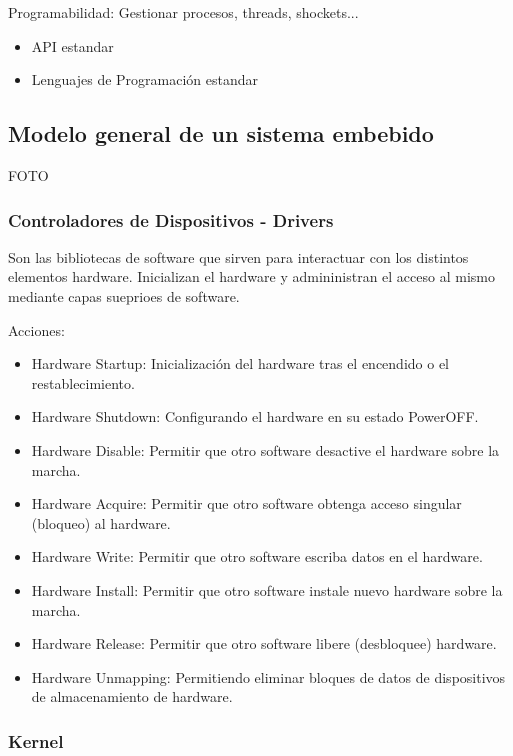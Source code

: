 \documentclass[12pt]{report} %
\begin{document}
Programabilidad: Gestionar procesos, threads, shockets...
\begin{itemize}
	\item API estandar 
	\item Lenguajes de Programación estandar 
\end{itemize}

\subsection{Modelo general de un sistema embebido}
FOTO

\subsubsection{Controladores de Dispositivos - Drivers}
Son las bibliotecas de software que sirven para interactuar con los distintos elementos hardware. Inicializan el hardware y admininistran el acceso al mismo mediante capas sueprioes de software.

Acciones:
 \begin{itemize}
	 \item Hardware Startup: 
	 Inicialización del hardware tras el encendido o el restablecimiento.
	 \item Hardware Shutdown: 
	 Configurando el hardware en su estado PowerOFF.
	 \item Hardware Disable: 
	 Permitir que otro software desactive el hardware sobre la marcha.
	 \item Hardware Acquire: 
	 Permitir que otro software obtenga acceso singular (bloqueo) al hardware.
	 \item Hardware Write: 
	  Permitir que otro software escriba datos en el hardware.
	 \item Hardware Install: 
	  Permitir que otro software instale nuevo hardware sobre la marcha.
	 \item Hardware Release: 
	  Permitir que otro software libere (desbloquee) hardware.
	 \item Hardware Unmapping: 
	 Permitiendo eliminar bloques de datos de dispositivos de almacenamiento de hardware.

 \end{itemize}

\subsubsection{Kernel}
\end{document}
